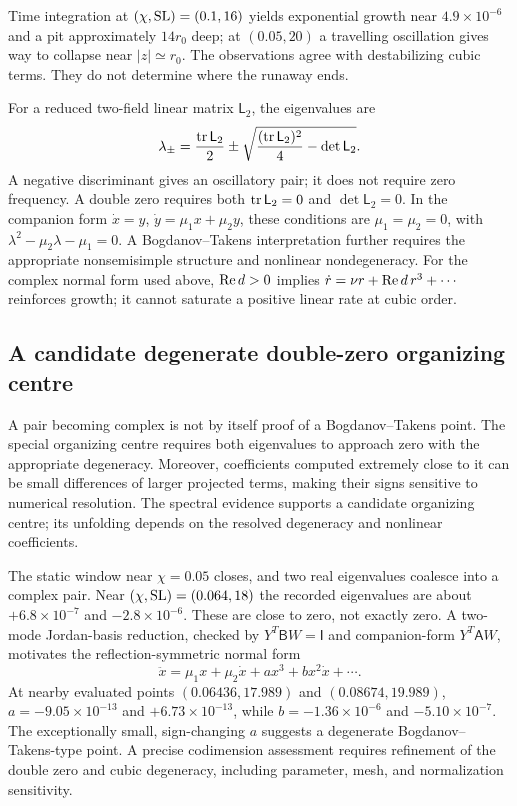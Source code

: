 Time integration at $(\chi,\mathrm{SL})=(0.1,16)$ yields exponential growth near $4.9\times10^{-6}$ and a pit approximately $14r_0$ deep; at $(0.05,20)$ a travelling oscillation gives way to collapse near $|z|\simeq r_0$. The observations agree with destabilizing cubic terms. They do not determine where the runaway ends.


For a reduced two-field linear matrix $\mathsf L_2$, the eigenvalues are
\begin{equation}
\lambda_\pm=\frac{\operatorname{tr}\mathsf L_2}{2}
\pm\sqrt{\frac{(\operatorname{tr}\mathsf L_2)^2}{4}-\det\mathsf L_2}.
\label{eq:two-mode-roots}
\end{equation}
A negative discriminant gives an oscillatory pair; it does not require zero frequency. A double zero requires both $\operatorname{tr}\mathsf L_2=0$ and $\det\mathsf L_2=0$. In the companion form $\dot x=y$, $\dot y=\mu_1x+\mu_2y$, these conditions are $\mu_1=\mu_2=0$, with $\lambda^2-\mu_2\lambda-\mu_1=0$. A Bogdanov--Takens interpretation further requires the appropriate nonsemisimple structure and nonlinear nondegeneracy. For the complex normal form used above, $\operatorname{Re} d>0$ implies $\dot r=\nu r+\operatorname{Re} d\,r^3+\cdots$ reinforces growth; it cannot saturate a positive linear rate at cubic order.

\subsection{A candidate degenerate double-zero organizing centre}


A pair becoming complex is not by itself proof of a Bogdanov--Takens point. The special organizing centre requires both eigenvalues to approach zero with the appropriate degeneracy. Moreover, coefficients computed extremely close to it can be small differences of larger projected terms, making their signs sensitive to numerical resolution. The spectral evidence supports a candidate organizing centre; its unfolding depends on the resolved degeneracy and nonlinear coefficients.


The static window near $\chi=0.05$ closes, and two real eigenvalues coalesce into a complex pair. Near $(\chi,\mathrm{SL})=(0.064,18)$ the recorded eigenvalues are about $+6.8\times10^{-7}$ and $-2.8\times10^{-6}$. These are close to zero, not exactly zero. A two-mode Jordan-basis reduction, checked by $Y^T\mathsf BW=\mathsf I$ and companion-form $Y^T\mathsf AW$, motivates the reflection-symmetric normal form
\begin{equation}
\ddot x=\mu_1x+\mu_2\dot x+a x^3+b x^2\dot x+\cdots .
\end{equation}
At nearby evaluated points $(0.06436,17.989)$ and $(0.08674,19.989)$, $a=-9.05\times10^{-13}$ and $+6.73\times10^{-13}$, while $b=-1.36\times10^{-6}$ and $-5.10\times10^{-7}$. The exceptionally small, sign-changing $a$ suggests a degenerate Bogdanov--Takens-type point. A precise codimension assessment requires refinement of the double zero and cubic degeneracy, including parameter, mesh, and normalization sensitivity.

